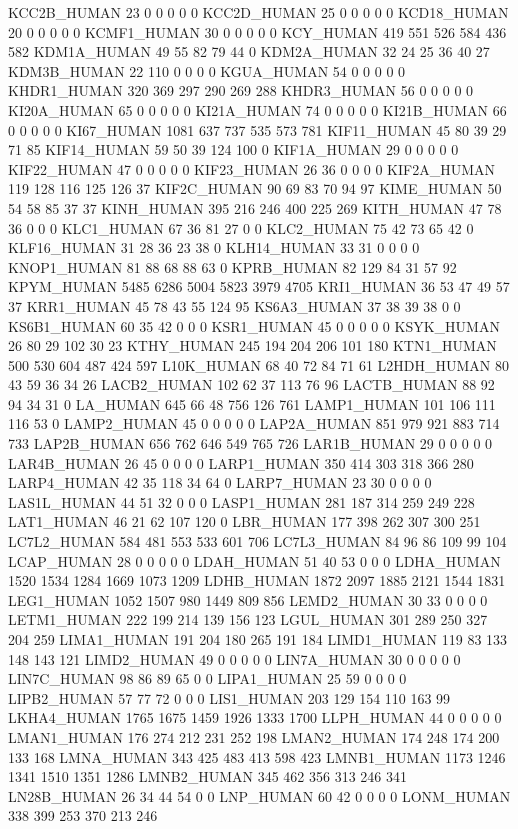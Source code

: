 KCC2B_HUMAN	23	0	0	0	0	0
KCC2D_HUMAN	25	0	0	0	0	0
KCD18_HUMAN	20	0	0	0	0	0
KCMF1_HUMAN	30	0	0	0	0	0
KCY_HUMAN	419	551	526	584	436	582
KDM1A_HUMAN	49	55	82	79	44	0
KDM2A_HUMAN	32	24	25	36	40	27
KDM3B_HUMAN	22	110	0	0	0	0
KGUA_HUMAN	54	0	0	0	0	0
KHDR1_HUMAN	320	369	297	290	269	288
KHDR3_HUMAN	56	0	0	0	0	0
KI20A_HUMAN	65	0	0	0	0	0
KI21A_HUMAN	74	0	0	0	0	0
KI21B_HUMAN	66	0	0	0	0	0
KI67_HUMAN	1081	637	737	535	573	781
KIF11_HUMAN	45	80	39	29	71	85
KIF14_HUMAN	59	50	39	124	100	0
KIF1A_HUMAN	29	0	0	0	0	0
KIF22_HUMAN	47	0	0	0	0	0
KIF23_HUMAN	26	36	0	0	0	0
KIF2A_HUMAN	119	128	116	125	126	37
KIF2C_HUMAN	90	69	83	70	94	97
KIME_HUMAN	50	54	58	85	37	37
KINH_HUMAN	395	216	246	400	225	269
KITH_HUMAN	47	78	36	0	0	0
KLC1_HUMAN	67	36	81	27	0	0
KLC2_HUMAN	75	42	73	65	42	0
KLF16_HUMAN	31	28	36	23	38	0
KLH14_HUMAN	33	31	0	0	0	0
KNOP1_HUMAN	81	88	68	88	63	0
KPRB_HUMAN	82	129	84	31	57	92
KPYM_HUMAN	5485	6286	5004	5823	3979	4705
KRI1_HUMAN	36	53	47	49	57	37
KRR1_HUMAN	45	78	43	55	124	95
KS6A3_HUMAN	37	38	39	38	0	0
KS6B1_HUMAN	60	35	42	0	0	0
KSR1_HUMAN	45	0	0	0	0	0
KSYK_HUMAN	26	80	29	102	30	23
KTHY_HUMAN	245	194	204	206	101	180
KTN1_HUMAN	500	530	604	487	424	597
L10K_HUMAN	68	40	72	84	71	61
L2HDH_HUMAN	80	43	59	36	34	26
LACB2_HUMAN	102	62	37	113	76	96
LACTB_HUMAN	88	92	94	34	31	0
LA_HUMAN	645	66	48	756	126	761
LAMP1_HUMAN	101	106	111	116	53	0
LAMP2_HUMAN	45	0	0	0	0	0
LAP2A_HUMAN	851	979	921	883	714	733
LAP2B_HUMAN	656	762	646	549	765	726
LAR1B_HUMAN	29	0	0	0	0	0
LAR4B_HUMAN	26	45	0	0	0	0
LARP1_HUMAN	350	414	303	318	366	280
LARP4_HUMAN	42	35	118	34	64	0
LARP7_HUMAN	23	30	0	0	0	0
LAS1L_HUMAN	44	51	32	0	0	0
LASP1_HUMAN	281	187	314	259	249	228
LAT1_HUMAN	46	21	62	107	120	0
LBR_HUMAN	177	398	262	307	300	251
LC7L2_HUMAN	584	481	553	533	601	706
LC7L3_HUMAN	84	96	86	109	99	104
LCAP_HUMAN	28	0	0	0	0	0
LDAH_HUMAN	51	40	53	0	0	0
LDHA_HUMAN	1520	1534	1284	1669	1073	1209
LDHB_HUMAN	1872	2097	1885	2121	1544	1831
LEG1_HUMAN	1052	1507	980	1449	809	856
LEMD2_HUMAN	30	33	0	0	0	0
LETM1_HUMAN	222	199	214	139	156	123
LGUL_HUMAN	301	289	250	327	204	259
LIMA1_HUMAN	191	204	180	265	191	184
LIMD1_HUMAN	119	83	133	148	143	121
LIMD2_HUMAN	49	0	0	0	0	0
LIN7A_HUMAN	30	0	0	0	0	0
LIN7C_HUMAN	98	86	89	65	0	0
LIPA1_HUMAN	25	59	0	0	0	0
LIPB2_HUMAN	57	77	72	0	0	0
LIS1_HUMAN	203	129	154	110	163	99
LKHA4_HUMAN	1765	1675	1459	1926	1333	1700
LLPH_HUMAN	44	0	0	0	0	0
LMAN1_HUMAN	176	274	212	231	252	198
LMAN2_HUMAN	174	248	174	200	133	168
LMNA_HUMAN	343	425	483	413	598	423
LMNB1_HUMAN	1173	1246	1341	1510	1351	1286
LMNB2_HUMAN	345	462	356	313	246	341
LN28B_HUMAN	26	34	44	54	0	0
LNP_HUMAN	60	42	0	0	0	0
LONM_HUMAN	338	399	253	370	213	246

